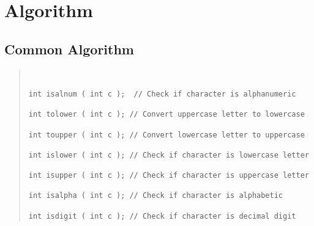 \chapter{Algorithm}\label{chp:Alg}

\section{Common Algorithm}

\begin{quote}
\begin{verbatim}


int isalnum ( int c );  // Check if character is alphanumeric

int tolower ( int c ); // Convert uppercase letter to lowercase

int toupper ( int c ); // Convert lowercase letter to uppercase

int islower ( int c ); // Check if character is lowercase letter

int isupper ( int c ); // Check if character is uppercase letter

int isalpha ( int c ); // Check if character is alphabetic

int isdigit ( int c ); // Check if character is decimal digit

\end{verbatim}
\end{quote}



